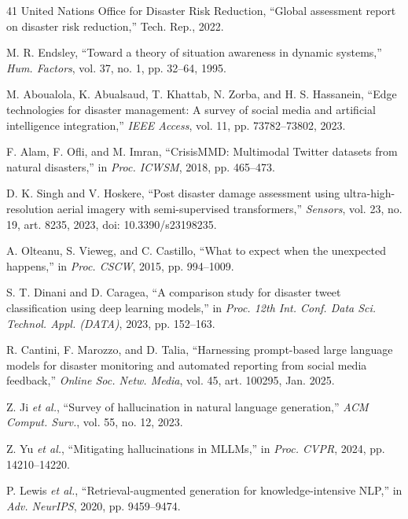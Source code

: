 \documentclass[conference]{IEEEtran}
\begin{document}
\def\IEEEbibitemsep{-1.2pt plus 0.4pt}
\begin{thebibliography}{41}
 United Nations Office for Disaster Risk Reduction, ``Global assessment report on disaster risk reduction,'' Tech. Rep., 2022.

 M. R. Endsley, ``Toward a theory of situation awareness in dynamic systems,'' \textit{Hum. Factors}, vol. 37, no. 1, pp. 32--64, 1995.

 M. Aboualola, K. Abualsaud, T. Khattab, N. Zorba, and H. S. Hassanein, ``Edge technologies for disaster management: A survey of social media and artificial intelligence integration,'' \textit{IEEE Access}, vol. 11, pp. 73782--73802, 2023.

 F. Alam, F. Ofli, and M. Imran, ``CrisisMMD: Multimodal Twitter datasets from natural disasters,'' in \textit{Proc. ICWSM}, 2018, pp. 465--473.

 D. K. Singh and V. Hoskere, ``Post disaster damage assessment using ultra-high-resolution aerial imagery with semi-supervised transformers,'' \textit{Sensors}, vol. 23, no. 19, art. 8235, 2023, doi: 10.3390/s23198235.

 A. Olteanu, S. Vieweg, and C. Castillo, ``What to expect when the unexpected happens,'' in \textit{Proc. CSCW}, 2015, pp. 994--1009.

 S. T. Dinani and D. Caragea, ``A comparison study for disaster tweet classification using deep learning models,'' in \textit{Proc. 12th Int. Conf. Data Sci. Technol. Appl. (DATA)}, 2023, pp. 152--163.

 R. Cantini, F. Marozzo, and D. Talia, ``Harnessing prompt-based large language models for disaster monitoring and automated reporting from social media feedback,'' \textit{Online Soc. Netw. Media}, vol. 45, art. 100295, Jan. 2025.

 Z. Ji \textit{et al.}, ``Survey of hallucination in natural language generation,'' \textit{ACM Comput. Surv.}, vol. 55, no. 12, 2023.

 Z. Yu \textit{et al.}, ``Mitigating hallucinations in MLLMs,'' in \textit{Proc. CVPR}, 2024, pp. 14210--14220.

 P. Lewis \textit{et al.}, ``Retrieval-augmented generation for knowledge-intensive NLP,'' in \textit{Adv. NeurIPS}, 2020, pp. 9459--9474.


\end{thebibliography}
\end{document}
